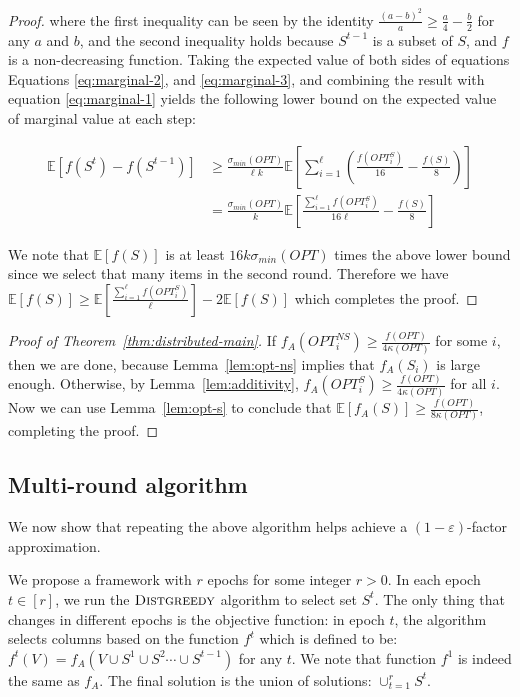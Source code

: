 \documentclass{article}
\newcommand{\E}{\mathbb{E}}
\newcommand{\eps}{\varepsilon}
\newcommand{\distgreedy}{\textsc{Distgreedy}}
\newcommand{\opt}{OPT}
\begin{document}
\begin{proof}
where the first inequality can be seen by the identity $\frac{(a-b)^2}{a} \geq \frac{a}{4} - \frac{b}{2}$ for any $a$ and $b$, and the second inequality holds because $S^{t-1}$ is a subset of $S$, and $f$ is a non-decreasing function. Taking the expected value of both sides of equations Equations \eqref{eq:marginal-2}, and \eqref{eq:marginal-3}, and combining the result with equation \eqref{eq:marginal-1} yields the following lower bound on the expected value of marginal value at each step:

\begin{align}
\E[f(S^t) - f(S^{t-1})]
&\geq \frac{\sigma_{min}(OPT)}{\ell k} \E[\sum_{i=1}^{\ell} (\frac{f(OPT_i^S)}{16} - \frac{f(S)}{8})] \\
&= \frac{\sigma_{min}(OPT)}{k} \E[\frac{\sum_{i=1}^{\ell} f(OPT_i^S)}{16\ell} - \frac{f(S)}{8}]
\end{align}

We note that $\E[f(S)]$ is at least ${16k}{\sigma_{min}(OPT)}$ times the above lower bound since we select that many items in the second round. Therefore we have $\E[f(S)] \geq \E[\frac{\sum_{i=1}^{\ell} f(OPT_i^S)}{\ell}] - 2\E[f(S)]$ which completes the proof.
\fi
\end{proof}
\begin{proof}[Proof of Theorem~\ref{thm:distributed-main}]
If $f_A( \opt_i^{NS}) \ge \frac{ f(\opt)}{4\kappa(\opt)}$ for some $i$, then we are done, because Lemma~\ref{lem:opt-ns} implies that $f_A(S_i)$ is large enough.  Otherwise, by Lemma~\ref{lem:additivity}, $f_A(\opt_i^{S}) \ge \frac{ f(\opt)}{4\kappa(\opt)}$ for all $i$. 
Now we can use Lemma~\ref{lem:opt-s} to conclude that $\E[ f_A(S) ] \ge \frac{ f(\opt)}{8\kappa(\opt)}$, completing the proof.
\end{proof}

\subsection{Multi-round algorithm}
We now show that repeating the above algorithm helps achieve a $(1-\eps)$-factor approximation.

We propose a framework with $r$ epochs for some integer $r>0$. In each epoch $t \in [r]$, we run the $\distgreedy$ algorithm to select set $S^t$. The only thing that changes in different epochs is the objective function: in epoch $t$, the algorithm selects columns based on the function $f^t$ which is defined to be: $f^t(V) = f_A(V \cup S^1 \cup S^2 \cdots \cup S^{t-1})$ for any $t$. We note that function $f^1$ is indeed the same as $f_A$. The final solution is the union of solutions: $\cup_{t=1}^r S^t$. 
\end{document}
